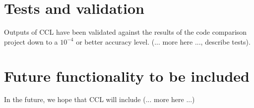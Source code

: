 \documentclass[\docopts]{\docclass}
\begin{document}
\section{Tests and validation}
\label{sec:tests}

Outputs of CCL have been validated against the results of the code comparison project down to a $10^{-4}$ or better accuracy level. (... more here ..., describe tests).

\section{Future functionality to be included}

In the future, we hope that CCL will include (... more here ...)





\end{document}
